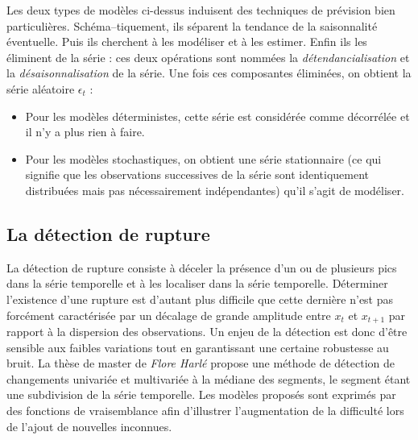 Les deux types de mod\`eles ci-dessus induisent des techniques de pr\'evision bien particuli\`eres. 
Sch\'ema--tiquement, ils s\'eparent la tendance de la saisonnalit\'e \'eventuelle. Puis ils cherchent \`a les mod\'eliser et \`a les estimer.  Enfin ils les \'eliminent de la s\'erie : ces deux op\'erations sont nomm\'ees
la {\em d\'etendancialisation} et la {\em d\'esaisonnalisation} de la s\'erie. Une fois ces composantes \'elimin\'ees, on obtient la s\'erie al\'eatoire $\epsilon_t$ :
\begin{itemize}
	\item Pour les mod\`eles d\'eterministes, cette s\'erie est consid\'er\'ee comme d\'ecorr\'el\'ee et il n'y a plus rien \`a faire.
	\item Pour les mod\`eles stochastiques, on obtient une s\'erie stationnaire (ce qui signifie que les observations successives de la s\'erie sont identiquement distribu\'ees mais pas n\'ecessairement ind\'ependantes) qu'il s'agit de mod\'eliser.
\end{itemize}

\subsection{La d\'etection de rupture}
La d\'etection de rupture consiste \`a d\'eceler la pr\'esence d'un ou de plusieurs pics dans la s\'erie temporelle et \`a les localiser dans la s\'erie temporelle. 
D\'eterminer l'existence d'une rupture est d'autant plus difficile que cette derni\`ere n'est pas forc\'ement caract\'eris\'ee par un d\'ecalage de grande amplitude entre $x_t$ et $x_{t+1}$ par rapport \`a la dispersion des observations. 
Un enjeu de la d\'etection est donc d'\^etre sensible aux faibles variations tout en garantissant une certaine robustesse au bruit.
La th\`ese de master de {\em Flore Harl\'e} \cite{floreHarleDetectionRuptureMultiples2006} 
propose une m\'ethode de d\'etection de changements univari\'ee et multivari\'ee \`a la m\'ediane des segments, le segment \'etant une subdivision de la s\'erie temporelle. Les mod\`eles propos\'es sont exprim\'es par des fonctions de vraisemblance afin d'illustrer l'augmentation de la difficult\'e lors de l'ajout de nouvelles inconnues.

